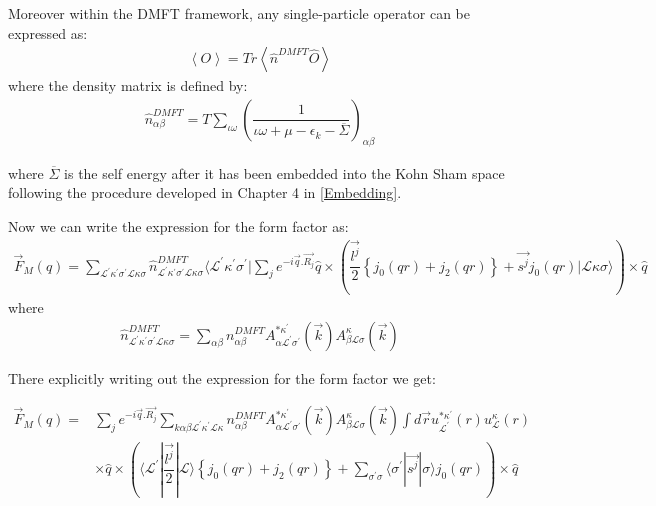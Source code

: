 \documentclass[10pt]{ruthesis}
\begin{document}
{ Moreover within the DMFT framework, any single-particle operator can be expressed as:
 \begin{align}
 \left\langle O \right\rangle = Tr \left\langle \hat{n}^{DMFT} \hat{O} \right\rangle
 \end{align}
where the density matrix is defined by:
\begin{align}
\hat{n}^{DMFT}_{\alpha \beta}=T \sum_{\iota \omega} \left( \dfrac{1}{\iota \omega +\mu -\epsilon_{k}-\overline{\Sigma}} \right)_{\alpha \beta}
\end{align}

where $\overline{\Sigma}$ is the self energy after it has been embedded into the Kohn Sham space following the procedure developed in Chapter 4 in \ref{Embedding}.

Now we can write the expression for the form factor as:
\begin{align}
\vec{F}_{M}(q)=\sum_{\mathcal{L}^{'}\kappa^{'}\sigma^{'} \mathcal{L}\kappa\sigma} \hat{n}^{DMFT}_{\mathcal{L}^{'}\kappa^{'}\sigma^{'} \mathcal{L}\kappa\sigma} \langle \mathcal{L}^{'}\kappa^{'}\sigma^{'} | \sum_{j} e^{-i\vec{q}.\vec{R_j}} \hat{q} \times\left( \dfrac{\vec{l^{j}}}{2} \left \lbrace j_{0}(qr) +j_{2}(qr) \right \rbrace + \vec{s^{j}} j_0(qr) |\mathcal{L}\kappa\sigma \rangle  \right) \times \hat{q}
\end{align}
where 
\begin{align}
\hat{n}^{DMFT}_{\mathcal{L}^{'}\kappa^{'}\sigma^{'} \mathcal{L}\kappa\sigma}=\sum_{\alpha \beta} n^{DMFT}_{\alpha \beta} A^{* \kappa^{'}}_{\alpha \mathcal{L}^{'} \sigma^{'}}(\vec{k}) A^{ \kappa}_{\beta \mathcal{L}\sigma}(\vec{k})
\end{align}

There explicitly writing out the expression for the form factor we get:

\begin{equation} \label{F_M_final}
\begin{split}
\vec{F}_{M}(q)= & \sum_{j} e^{-i\vec{q}.\vec{R_j}}   \sum_{k\alpha \beta \mathcal{L}^{'} \kappa^{'} \mathcal{L}\kappa} n^{DMFT}_{\alpha \beta} A^{* \kappa^{'}}_{\alpha \mathcal{L}^{'} \sigma^{'}}(\vec{k}) A^{ \kappa}_{\beta \mathcal{L}\sigma}(\vec{k}) \int d \vec{r}u_{\mathcal{L^{'}}}^{*\kappa^{'} }(r)u_{\mathcal{L}}^{\kappa}(r) \\
& \times \hat{q} \times\left( \langle\mathcal{L^{'}}| \dfrac{\vec{l^j}}{2}|\mathcal{L}\rangle  \left\lbrace  j_{0}(qr) +j_{2}(qr) \right \rbrace +   \sum_{\sigma^{'} \sigma} \langle \sigma^{'} |\vec{s^j}|\sigma \rangle
 j_0(qr) \right) \times \hat{q} 
\end{split}
\end{equation}
 

}
\end{document}
